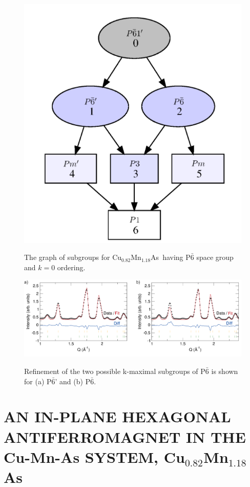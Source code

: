 \documentclass[10pt,doublespacing,edeposit]{uiucthesis2020}
\newcommand*{\cumnas}{Cu$_{0.82}$Mn$_{1.18}$As}
\begin{document}
\begin{mainmatter}
\begin{figure}
\centering\includegraphics[width=0.5\columnwidth]{figures/ch4/subgraph_cumnas.png} \\
\caption{\label{fig:subgraph_cumnas}
The graph of subgroups for \cumnas\ having P$\bar{6}$ space group and $k=0$ ordering.
}
\end{figure}


\begin{figure}
\centering\includegraphics[width=\columnwidth]{figures/ch4/wand_refinement.png} \\
\caption{\label{fig:wand_refinement}
Refinement of the two possible k-maximal subgroups of P$\bar{6}$ is shown for (a) P$\bar{6}$' and (b) P$\bar{6}$.
}
\end{figure}

\chapter{AN IN-PLANE HEXAGONAL ANTIFERROMAGNET IN THE Cu-Mn-As SYSTEM, Cu$_{0.82}$Mn$_{1.18}$As}


\vspace{20mm}


\end{mainmatter}
\end{document}
